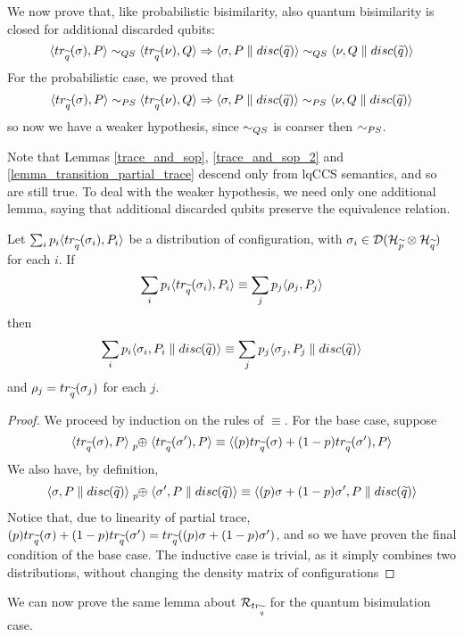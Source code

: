 We now prove that, like probabilistic bisimilarity, also quantum bisimilarity is closed for additional discarded qubits: 
\[\langle tr_{\widetilde{q}}(\sigma), P\rangle \sim_{QS} \langle tr_{\widetilde{q}}(\nu), Q\rangle \Rightarrow \langle\sigma, P\parallel disc(\widetilde{q})\rangle \sim_{QS} \langle\nu, Q\parallel disc(\widetilde{q})\rangle\] 
For the probabilistic case, we proved that \[\langle tr_{\widetilde{q}}(\sigma), P\rangle \sim_{PS} \langle tr_{\widetilde{q}}(\nu), Q\rangle \Rightarrow \langle\sigma, P\parallel disc(\widetilde{q})\rangle \sim_{PS} \langle\nu, Q\parallel disc(\widetilde{q})\rangle\] so now we have a weaker hypothesis, since $\sim_{QS}$ is coarser then $\sim_{PS}$.

Note that Lemmas \ref{trace_and_sop}, \ref{trace_and_sop_2} and \ref{lemma_transition_partial_trace} descend only from lqCCS semantics, and so are still true. To deal with the weaker hypothesis, we need only one additional lemma, saying that  additional discarded qubits preserve the equivalence relation.

\begin{lemma}\label{lemma_quantum_equivalence_partial_trace}
Let $\sum_i p_i \langle tr_{\widetilde{q}}(\sigma_i), P_i\rangle$ be a distribution of configuration, with $\sigma_i \in \mathcal{D}(\mathcal{H}_{\widetilde{p}} \otimes \mathcal{H}_{\widetilde{q}})$ for each $i$.  If \[\sum_i p_i \langle tr_{\widetilde{q}}(\sigma_i), P_i\rangle \equiv \sum_j p_j \langle\rho_j, P_j\rangle\]
then 
\[\sum_i p_i \langle\sigma_i, P_i\parallel disc(\widetilde{q})\rangle \equiv \sum_j p_j \langle\sigma_j, P_j\parallel disc(\widetilde{q})\rangle\]
and $\rho_j = tr_{\widetilde{q}}(\sigma_j)$ for each $j$.
\end{lemma}
\begin{proof}
We proceed by induction on the rules of $\equiv$. For the base case, suppose \[
\confw{\trQ(\sigma), P} \psum{p} \confw{\trQ(\sigma'), P} \equiv \confw{(p)\trQ(\sigma) + (1-p)\trQ(\sigma'), P}\]
We also have, by definition,  \[\confw{\sigma, P\parallel \discQ} \psum{p} \confw{\sigma', P\parallel \discQ} \equiv \confw{(p)\sigma + (1-p)\sigma', P\parallel \discQ}\]
Notice that, due to linearity of partial trace, $(p)tr_{\widetilde{q}}(\sigma) + (1-p)tr_{\widetilde{q}}(\sigma') = tr_{\widetilde{q}}((p)\sigma + (1-p)\sigma')$, and so we have proven the final condition of the base case.
The inductive case is trivial, as it simply combines two distributions, without changing the density matrix of configurations
\end{proof}

We can now prove the same lemma about $\mathcal{R}_{tr_{\widetilde{q}}}$ for the quantum bisimulation case.

